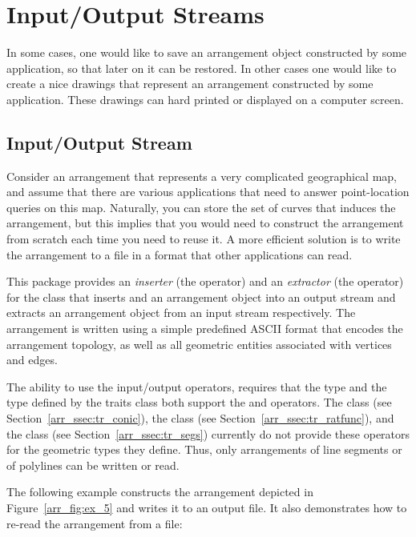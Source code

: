 \section{Input/Output Streams\label{arr_sec:io}}

In some cases, one would like to save an arrangement object constructed
by some application, so that later on it can be restored. In other cases 
one would like to create a nice drawings that represent an arrangement 
constructed by some application. These drawings can hard printed or
displayed on a computer screen.

\subsection{Input/Output Stream}\label{arr_ssec:io_stream}
Consider an arrangement that represents a very complicated geographical 
map, and assume that there are various applications that need to answer 
point-location queries on this map. Naturally, you can store the set of 
curves that induces the arrangement, but this implies that you would need 
to construct the arrangement from scratch each time you need to reuse it.
A more efficient solution is to write the arrangement to a file in a format 
that other applications can read.

This package provides an {\em inserter} (the \ccc{<<} operator) and an 
{\em extractor} (the \ccc{>>} operator) for the 
 class that inserts and an arrangement
object into an output stream and extracts an arrangement object from an
input stream respectively. The arrangement is written using a simple
predefined ASCII format that encodes the arrangement topology, as well
as all geometric entities associated with vertices and edges.

The ability to use the input/output operators, requires that the 
 type and the  type defined by the 
traits class both support the \ccc{<<} and \ccc{>>} operators. The 
 class (see Section~\ref{arr_ssec:tr_conic}), the 
 class (see Section~\ref{arr_ssec:tr_ratfunc}),
and the  class (see Section~\ref{arr_ssec:tr_segs})
currently do not provide these operators for the geometric types they define. 
Thus, only arrangements of line segments or of polylines can be written or 
read.

The following example constructs the arrangement depicted in 
Figure~\ref{arr_fig:ex_5} and writes it to an output file. It also
demonstrates how to re-read the arrangement from a file:


